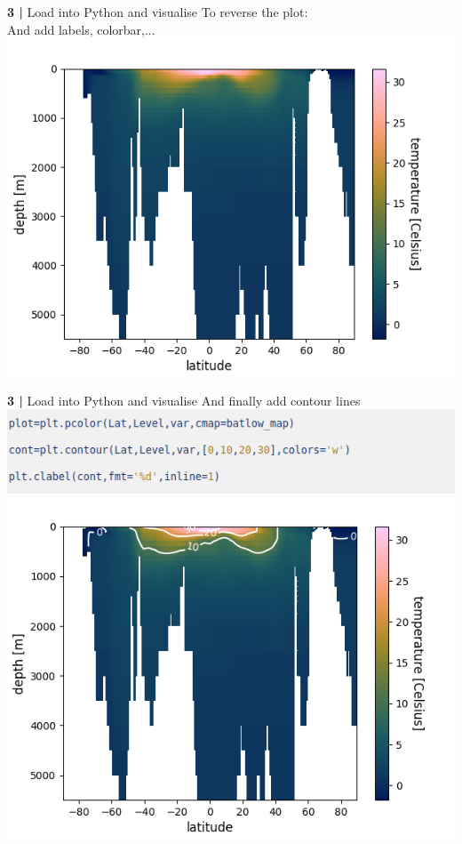  
\begin{frame}{\textbf{3 |} Load into Python and visualise} 
    To reverse the plot:\\
    And add labels, colorbar,...
    \includegraphics[scale=0.35]{images/script1_fig8.png}
\end{frame}


\begin{frame}{\textbf{3 |} Load into Python and visualise} 
    And finally add contour lines\\
    \includegraphics[scale=0.35]{images/script1_step12.png}\\
    \includegraphics[scale=0.35]{images/script1_fig9.png}
\end{frame}


